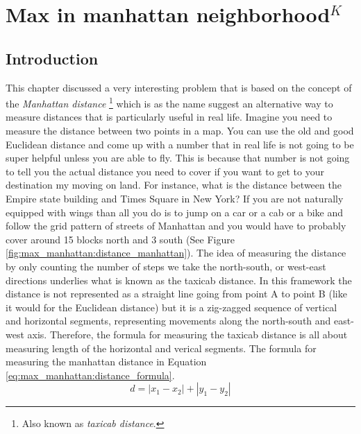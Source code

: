 %



\chapter{Max in manhattan neighborhood$^{K}$}
\label{ch:max_manhattan}
\section*{Introduction}
This chapter discussed a very interesting problem that is based on the concept of the
\textit{Manhattan distance} \footnote{Also known as \textit{taxicab distance}.}
which is as the name suggest an alternative way to measure distances that
is particularly useful in real life. Imagine you need to measure the distance between two points in
a map. You can use the old and good Euclidean distance and come up with a number that in real life
is not going to be super helpful unless you are able to fly. This is because that number is not
going to tell you the actual distance you need to cover if you want to get to your destination my
moving on land. For instance, what is the distance between the Empire state building and Times
Square in New York? If you are not naturally equipped with wings than all you do is to jump on a car
or a cab or a bike and follow the grid pattern of streets of Manhattan and you would have to
probably cover around 15 blocks north and 3 south (See Figure
\ref{fig:max_manhattan:distance_manhattan}). The idea of measuring the distance by only counting the
number of steps we take the north-south, or west-east directions underlies what is known as the
taxicab distance. In this framework the distance is not represented as a straight line going from
point A to point B (like it would for the Euclidean distance) 
but it is a zig-zagged sequence of vertical and horizontal segments, representing movements along the north-south and east-west axis.
Therefore, the formula for measuring the taxicab distance is all about measuring length of the horizontal and verical
segments. The formula for measuring the manhattan distance in Equation
\ref{eq:max_manhattan:distance_formula}.
\begin{equation}
	d = |x_1-x_2|+|y_1-y_2|
	\label{eq:max_manhattan:distance_formula}
\end{equation}

